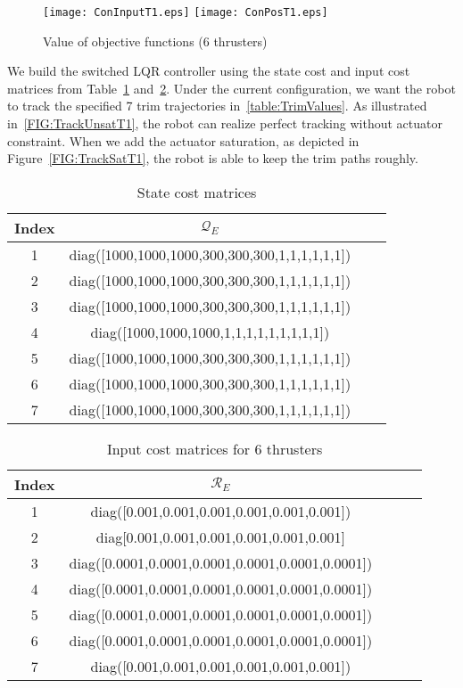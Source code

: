 \begin{figure}
\center
\texttt{[image: ConInputT1.eps]}
\texttt{[image: ConPosT1.eps]}
\caption{Value of objective functions (6 thrusters)}	
\label{FIG:ConInputPosT1}
\end{figure}
\newpage
We build the switched LQR controller using the state cost and input cost matrices from Table~\ref{table:QParameters} and~\ref{table:RParameters for 6 thrusters}. 
Under the current configuration, we want the robot to track the specified 7 trim trajectories in~\ref{table:TrimValues}. As illustrated in~\ref{FIG:TrackUnsatT1}, the robot can realize perfect tracking without actuator constraint. When we add the actuator saturation, as depicted in Figure~\ref{FIG:TrackSatT1}, the robot is able to keep the trim paths roughly.
  
\begin{table}
\centering
\small
\caption{State cost matrices }
\begin{tabular}{| c | c | c | p{0.5cm} |}
\hline
Index&$\mathcal{Q}_{E}$\\ \hline
1&diag([1000,1000,1000,300,300,300,1,1,1,1,1,1]) \\ \hline
2&diag([1000,1000,1000,300,300,300,1,1,1,1,1,1]) \\ \hline
3&diag([1000,1000,1000,300,300,300,1,1,1,1,1,1])\\ \hline
4&diag([1000,1000,1000,1,1,1,1,1,1,1,1,1]) \\ \hline
5&diag([1000,1000,1000,300,300,300,1,1,1,1,1,1])\\ \hline
6&diag([1000,1000,1000,300,300,300,1,1,1,1,1,1])\\ \hline
7&diag([1000,1000,1000,300,300,300,1,1,1,1,1,1]) \\ \hline
\end{tabular}
\label{table:QParameters}
\end{table} 
\begin{table}
\centering
\small
\caption{Input cost matrices for 6 thrusters}
\begin{tabular}{| c | c | c | c | p{0.5cm} |}
\hline
Index&$\mathcal{R}_{E}$ \\ \hline
1&diag([0.001,0.001,0.001,0.001,0.001,0.001])\\ \hline
2&diag[0.001,0.001,0.001,0.001,0.001,0.001] \\ \hline
3&diag([0.0001,0.0001,0.0001,0.0001,0.0001,0.0001])\\ \hline
4&diag([0.0001,0.0001,0.0001,0.0001,0.0001,0.0001]) \\ \hline
5&diag([0.0001,0.0001,0.0001,0.0001,0.0001,0.0001])\\ \hline
6&diag([0.0001,0.0001,0.0001,0.0001,0.0001,0.0001])\\ \hline
7&diag([0.001,0.001,0.001,0.001,0.001,0.001]) \\ \hline
\end{tabular}
\label{table:RParameters for 6 thrusters}
\end{table} 

